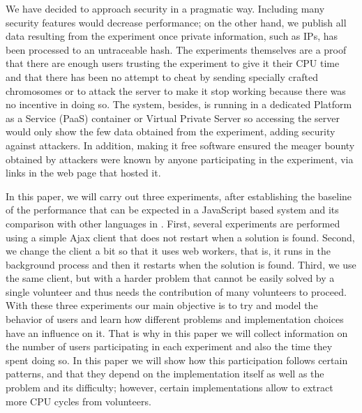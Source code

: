 \documentclass{sig-alternate}
\begin{document}
We have decided to approach security in a pragmatic way. Including
many security features %
would decrease performance; on the other hand, we publish all data
resulting from the experiment once private information, such as IPs,
has been processed to an untraceable hash. The experiments themselves
are a proof that there are enough users trusting the experiment to
give it their CPU time and that there has been no attempt to cheat by
sending specially crafted chromosomes or to attack the server to make
it stop working because there was no incentive in doing so.
The
system, besides, is running in a dedicated Platform as a Service (PaaS)
container or Virtual Private Server so accessing the server would only
show the few data obtained from the experiment, adding security against attackers. In addition, making it
free software ensured the meager bounty obtained by attackers were
known by anyone participating in the experiment, via 
links in the web page that hosted it. %

In this paper, we will carry out three experiments, after establishing
the baseline of the performance that can be expected in a JavaScript
based system and its comparison with other languages in
\cite{2016arXiv160101607Manom}. First, several experiments are
performed using a simple Ajax client that does not 
restart when a solution is found. Second, we change the client a bit
so that it uses web workers, that is, it runs in the background
process and then it restarts when the solution is found. Third, we use the same
client, but with a harder problem that cannot be easily solved by a single
volunteer and thus needs the contribution of many volunteers to
proceed. 
With these three experiments our main objective is to try and model
the behavior of users and learn how different problems and
implementation choices have an influence on it. That is why in this
paper we will collect information on the number of users participating
in each experiment and also the time they spent doing so. In this
paper we will show how this participation follows certain patterns,
and that they depend on the implementation itself as well as the
problem and its difficulty; however, certain implementations allow to
extract more CPU cycles from volunteers. 
\end{document}
